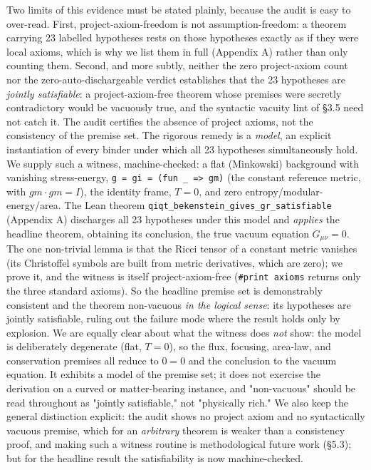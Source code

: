 \documentclass[11pt]{article}
\begin{document}
Two limits of this evidence must be stated plainly, because the audit is easy to over-read. First,
project-axiom-freedom is not assumption-freedom: a theorem carrying 23 labelled hypotheses rests on
those hypotheses exactly as if they were local axioms, which is why we list them in full (Appendix A)
rather than only counting them. Second, and more subtly, neither the zero project-axiom count nor the
zero-auto-dischargeable verdict establishes that the 23 hypotheses are \emph{jointly satisfiable}: a
project-axiom-free theorem whose premises were secretly contradictory would be vacuously true, and
the syntactic vacuity lint of §3.5 need not catch it. The audit certifies the absence of project
axioms, not the consistency of the premise set. The rigorous remedy is a \emph{model}, an explicit
instantiation of every binder under which all 23 hypotheses simultaneously hold.
We supply such a witness, machine-checked: a flat (Minkowski) background with vanishing
stress-energy, \texttt{g = gi = (fun \_ => gm)} (the constant reference metric, with $gm\cdot gm = I$), the
identity frame, $T=0$, and zero entropy/modular-energy/area. The Lean theorem
\texttt{qiqt\_bekenstein\_gives\_gr\_satisfiable} (Appendix A) discharges all 23 hypotheses under this model and
\emph{applies} the headline theorem, obtaining its conclusion, the true vacuum equation $G_{\mu\nu}=0$.
The one non-trivial lemma is that the Ricci tensor of a constant metric vanishes (its Christoffel
symbols are built from metric derivatives, which are zero); we prove it, and the witness is itself
project-axiom-free (\texttt{\#print axioms} returns only the three standard axioms). So the headline premise
set is demonstrably consistent and the theorem non-vacuous \emph{in the logical sense}: its hypotheses
are jointly satisfiable, ruling out the failure mode where the result holds only by explosion. We are
equally clear about what the witness does \emph{not} show: the model is deliberately degenerate (flat,
$T=0$), so the flux, focusing, area-law, and conservation premises all reduce to $0=0$ and the
conclusion to the vacuum equation. It exhibits a model of the premise set; it does not exercise the
derivation on a curved or matter-bearing instance, and "non-vacuous" should be read throughout as
"jointly satisfiable," not "physically rich." We also keep the general distinction explicit: the
audit shows no project axiom and no syntactically vacuous premise, which for an \emph{arbitrary} theorem
is weaker than a consistency proof, and making such a witness routine is methodological future work
(§5.3); but for the headline result the satisfiability is now machine-checked.
\end{document}
